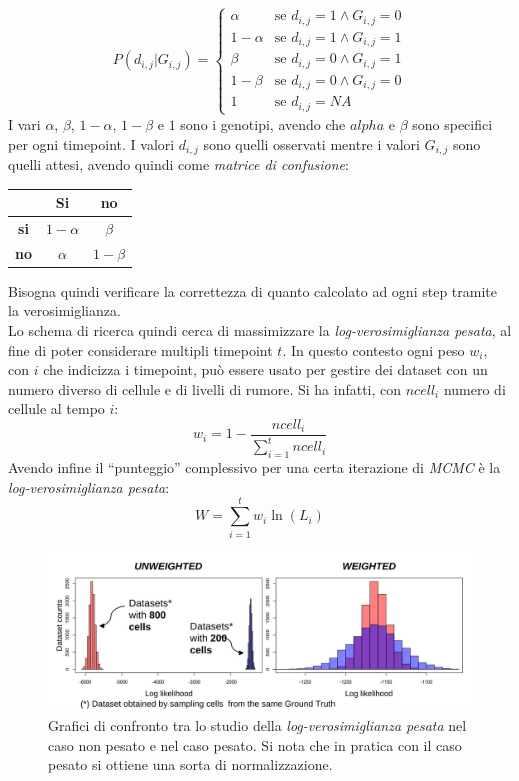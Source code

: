 \documentclass[a4paper,12pt, oneside]{book}
\begin{document}
\[P(d_{i,j}|G_{i,j})=
  \begin{cases}
    \alpha&\mbox{se }d_{i,j}=1\land G_{i,j}=0\\
    1-\alpha&\mbox{se }d_{i,j}=1\land G_{i,j}=1\\
    \beta&\mbox{se }d_{i,j}=0\land G_{i,j}=1\\
    1-\beta&\mbox{se }d_{i,j}=0\land G_{i,j}=0\\
    1&\mbox{se }d_{i,j}=NA
  \end{cases}
\]
I vari $\alpha$, $\beta$, $1-\alpha$, $1-\beta$ e $1$ sono i genotipi, avendo
che $alpha$ e $\beta$ sono specifici per ogni timepoint. I valori 
$d_{i,j}$ sono quelli osservati mentre i valori $G_{i,j}$ sono quelli attesi,
avendo quindi come \textit{matrice di confusione}:
\begin{table}[H]
  \centering
  \begin{tabular}{c||c|c}
    &\textbf{Si}& \textbf{no} \\
    \hline
    \hline
    \textbf{si}& $1-\alpha$&$\beta$\\
    \textbf{no}& $\alpha$&$1-\beta$
  \end{tabular}
\end{table}
Bisogna quindi verificare la correttezza di quanto calcolato ad ogni step tramite
la verosimiglianza.\\
Lo schema di ricerca quindi cerca di massimizzare la \textit{log-verosimiglianza
  pesata}, al fine di poter considerare multipli timepoint $t$. In questo
contesto ogni peso $w_i$, con $i$ che indicizza i timepoint, può essere usato
per gestire dei dataset con un numero diverso di cellule e di livelli di
rumore. Si ha infatti, con $ncell_i$ numero di cellule al tempo $i$: 
\[w_i=1-\frac{ncell_i}{\sum_{i=1}^tncell_i}\]
Avendo infine il ``punteggio'' complessivo per una certa iterazione di
\textit{MCMC} è la \textit{log-verosimiglianza pesata}:
\[W=\sum_{i=1}^t w_i\ln(L_i)\]
\begin{figure}
  \centering
  \includegraphics[scale = 0.2]{img/log.jpg}
  \caption{Grafici di confronto tra lo studio della \textit{log-verosimiglianza
      pesata} nel caso non pesato e nel caso pesato. Si nota che in pratica con
    il caso pesato si ottiene una sorta di normalizzazione.} 
\end{figure}
\end{document}
